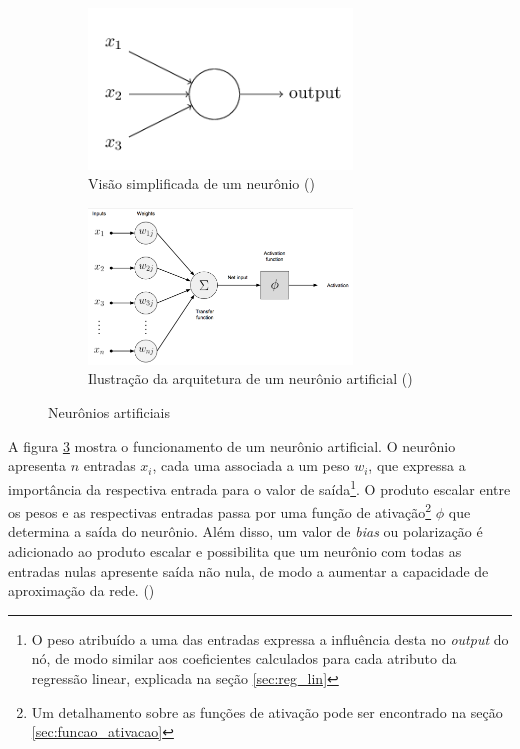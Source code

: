 \begin{figure}[H]  
  \centering
  \begin{subfigure}{7cm}
    \centering 
    \includegraphics[width=7cm]{../figuras/perceptron-simples.png}
    \caption{Visão simplificada de um neurônio (\cite{deeplearningbook})}
    \label{fig:perceptron-simples}
  \end{subfigure}
  \hfill
  \begin{subfigure}{7cm}
    \centering
    \includegraphics[width=7cm]{../figuras/perceptron.png}
    \caption{Ilustração da arquitetura de um 
    neurônio artificial (\cite{dl-oreilly})}
    \label{fig:perceptron}
  \end{subfigure}
  \caption{Neurônios artificiais}
\end{figure}

A figura \ref{fig:perceptron} mostra o funcionamento de 
um neurônio artificial. O neurônio apresenta $n$ entradas 
$x_i$, cada uma associada a um peso $w_i$, que expressa 
a importância da respectiva entrada para o valor de saída\footnote{ 
O peso atribuído a uma das entradas expressa a influência
desta no \textit{output} do nó, de modo similar aos coeficientes calculados 
para cada atributo da regressão linear, explicada na seção \ref{sec:reg_lin}}.
O produto escalar entre os pesos e as respectivas entradas
 passa por uma função de 
ativação\footnote{Um detalhamento sobre as funções de 
ativação pode ser encontrado na seção \ref{sec:funcao_ativacao}} 
$\phi$ que determina a saída do neurônio. 
Além disso, um valor de \textit{bias} ou polarização é
adicionado ao produto escalar e possibilita que 
um neurônio com todas as entradas nulas
apresente saída não nula, de modo a
aumentar a capacidade de aproximação da rede. 
(\cite{deeplearningbook})

